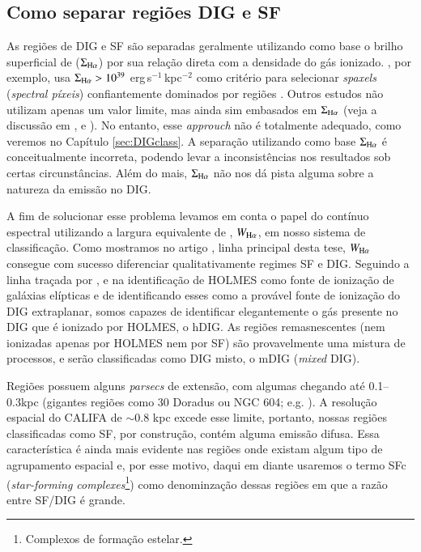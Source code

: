 \subsection{Como separar regiões DIG e SF}
\label{sec:intro:DIG:class}
As regiões de DIG e SF são separadas geralmente utilizando como base o brilho superficial de \Ha ($\Sigma_{\Ha}$) por sua relação direta com a densidade do gás ionizado. \citet{Zhang.etal.2017a}, por exemplo, usa $\Sigma_{\Ha} > 10^{39}$ erg$\,$s$^{-1}\,$kpc$^{-2}$ como critério para selecionar {\em spaxels} ({\em spectral píxeis}) confiantemente dominados por regiões \hii. Outros estudos não utilizam apenas um valor limite, mas ainda sim embasados em $\Sigma_{\Ha}$ (veja a discussão em \citealt{Zurita.etal.2000}, \citealt{Oey.etal.2007} e \citealt{Vogt.etal.2017a}). No entanto, esse {\em approuch} não é totalmente adequado, como veremos no Capítulo \ref{sec:DIGclass}. A separação utilizando como base $\Sigma_{\Ha}$ é conceitualmente incorreta, podendo levar a inconsistências nos resultados sob certas circunstâncias. Além do mais, $\Sigma_{\Ha}$ não nos dá pista alguma sobre a natureza da emissão no DIG.

A fim de solucionar esse problema levamos em conta o papel do contínuo espectral utilizando a largura equivalente de \Ha, $W_{\Ha}$, em nosso sistema de classificação. Como mostramos no artigo \citet[][Apêndice \ref{apendice:DIGpaper0}]{Lacerda.etal.2018}, linha principal desta tese, $W_{\Ha}$ consegue com sucesso diferenciar qualitativamente regimes SF e DIG. Seguindo a linha traçada por \citet{Binette.etal.1994a}, \citet{Stasinska.etal.2008a} e \citet{CidFernandes.etal.2011a} na identificação de HOLMES como fonte de ionização de galáxias elípticas e de \citet{FloresFajardo.etal.2011a} identificando esses como a provável fonte de ionização do DIG extraplanar, somos capazes de identificar elegantemente o gás presente no DIG que é ionizado por HOLMES, o hDIG. As regiões remasnescentes (nem ionizadas apenas por HOLMES nem por SF) são provavelmente uma mistura de processos, e serão classificadas como DIG misto, o mDIG ({\em mixed} DIG).

Regiões \hii possuem alguns {\em parsecs} de extensão, com algumas chegando até 0.1--0.3kpc (gigantes regiões como 30 Doradus ou NGC 604; e.g. \citealt{Rosa.y.Enrique.2000}). A resolução espacial do CALIFA de $\sim 0.8$ kpc excede esse limite, portanto, nossas regiões classificadas como SF, por construção, contém alguma emissão difusa. Essa característica é ainda mais evidente nas regiões onde existam algum tipo de agrupamento espacial e, por esse motivo, daqui em diante usaremos o termo SFc ({\em star-forming complexes}\footnote{Complexos de formação estelar.}) como denominzação dessas regiões em que a razão entre SF/DIG é grande.


